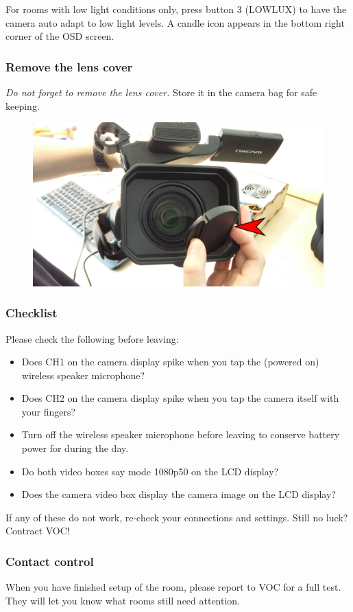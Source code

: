 \documentclass{article}
\begin{document}
For rooms with low light conditions only, press button 3 (LOWLUX) to have the camera auto adapt to low light levels. A candle icon appears in the bottom right corner of the OSD screen.

\subsubsection{Remove the lens cover}
\emph{Do not forget to remove the lens cover.} Store it in the camera bag for safe keeping.

\begin{figure}[H]
  \centering
\includegraphics[width = 120mm]{Sony07.jpg}
\end{figure}

\subsubsection{Checklist}
Please check the following before leaving:
\begin{itemize}
  \item Does CH1 on the camera display spike when you tap the (powered on) wireless speaker microphone?
  \item Does CH2 on the camera display spike when you tap the camera itself with your fingers?
  \item Turn off the wireless speaker microphone before leaving to conserve battery power for during the day.
  \item Do both video boxes say mode 1080p50 on the LCD display?
  \item Does the camera video box display the camera image on the LCD display?
\end{itemize}

If any of these do not work, re-check your connections and settings. Still no luck? Contract VOC!

\subsubsection{Contact control}
When you have finished setup of the room, please report to VOC for a full test.
They will let you know what rooms still need attention.
\end{document}

